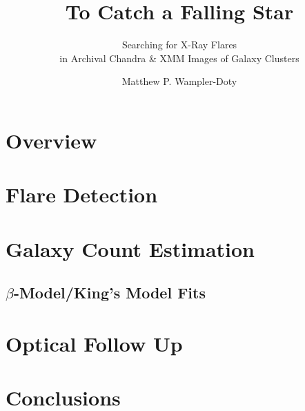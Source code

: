 \usepackage{graphicx}
\usepackage{hyperref}
\usepackage{marvosym}
\title{To Catch a Falling Star}
\subtitle{Searching for X-Ray Flares \\ 
in Archival Chandra \& XMM Images of Galaxy Clusters}
\author{Matthew P. Wampler-Doty}
\date{}

\maketitle
{}
\section{Overview}

\section{Flare Detection}

\section{Galaxy Count Estimation}
\subsection{$\beta$-Model/King's Model Fits}
\section{Optical Follow Up}
\section{Conclusions}

